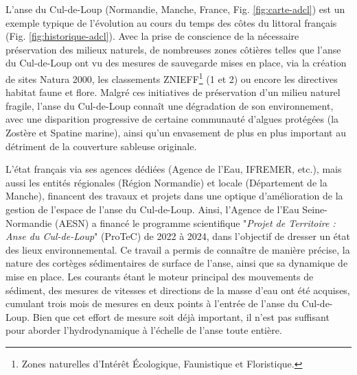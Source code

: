 \documentclass[10pt,a4paper,titlepage]{article}
\begin{document}
L'anse du Cul-de-Loup (Normandie, Manche, France, Fig. \ref{fig:carte-adcl}) est un exemple typique de l'évolution au cours du temps des côtes du littoral français (Fig. \ref{fig:historique-adcl}). Avec la prise de conscience de la nécessaire préservation des milieux naturels, de nombreuses zones côtières telles que l'anse du Cul-de-Loup ont vu des mesures de sauvegarde mises en place, via la création de sites Natura 2000, les classements ZNIEFF\footnote{Zones naturelles d’Intérêt Écologique, Faunistique et Floristique.} (1 et 2) ou encore les directives habitat faune et flore. Malgré ces initiatives de préservation d'un milieu naturel fragile, l'anse du Cul-de-Loup connaît une dégradation de son environnement, avec une disparition progressive de certaine communauté d'algues protégées (la Zostère et Spatine marine), ainsi qu'un envasement de plus en plus important au détriment de la couverture sableuse originale.

L'état français via ses agences dédiées (Agence de l'Eau, IFREMER, etc.), mais aussi les entités régionales (Région Normandie) et locale (Département de la Manche), financent des travaux et projets dans une optique d'amélioration de la gestion de l'espace de l'anse du Cul-de-Loup. Ainsi, l'Agence de l'Eau Seine-Normandie (AESN) a financé le programme scientifique "\textit{Projet de Territoire : Anse du Cul-de-Loup}" (ProTeC) de 2022 à 2024, dans l'objectif de dresser un état des lieux environnemental. Ce travail a permis de connaître de manière précise, la nature des cortèges sédimentaires de surface de l'anse, ainsi que sa dynamique de mise en place. Les courants étant le moteur principal des mouvements de sédiment, des mesures de vitesses et directions de la masse d'eau ont été acquises, cumulant trois mois de mesures en deux points à l'entrée de l'anse du Cul-de-Loup. Bien que cet effort de mesure soit déjà important, il n'est pas suffisant pour aborder l'hydrodynamique à l'échelle de l'anse toute entière.
\end{document}
